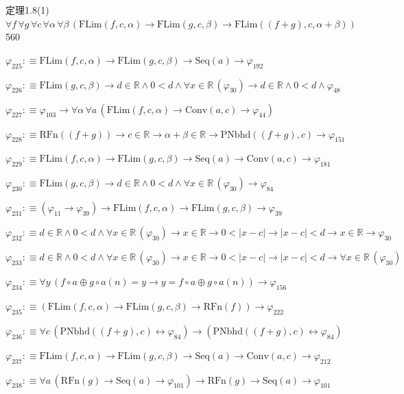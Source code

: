 \begin{fullproof}{定理1.8(1)}{$\forall f\,\forall g\,\forall c\,\forall \alpha\,\forall \beta\,(\mathrm{FLim}(f,c,\alpha) \to \mathrm{FLim}(g,c,\beta) \to \mathrm{FLim}((f + g),c,\alpha + \beta))$}{560}
\begin{abbrevlist}
\item $\varphi_{225} :\equiv \mathrm{FLim}(f,c,\alpha) \to \mathrm{FLim}(g,c,\beta) \to \mathrm{Seq}(a) \to \varphi_{192}$
\item $\varphi_{226} :\equiv \mathrm{FLim}(g,c,\beta) \to d \in \mathbb{R} \land 0 < d \land \forall x \in \mathbb{R}\,(\varphi_{30}) \to d \in \mathbb{R} \land 0 < d \land \varphi_{48}$
\item $\varphi_{227} :\equiv \varphi_{103} \to \forall \alpha\,\forall a\,(\mathrm{FLim}(f,c,\alpha) \to \mathrm{Conv}(a,c) \to \varphi_{44})$
\item $\varphi_{228} :\equiv \mathrm{RFn}((f + g)) \to c \in \mathbb{R} \to \alpha + \beta \in \mathbb{R} \to \mathrm{PNbhd}((f + g),c) \to \varphi_{151}$
\item $\varphi_{229} :\equiv \mathrm{FLim}(f,c,\alpha) \to \mathrm{FLim}(g,c,\beta) \to \mathrm{Seq}(a) \to \mathrm{Conv}(a,c) \to \varphi_{181}$
\item $\varphi_{230} :\equiv \mathrm{FLim}(g,c,\beta) \to d \in \mathbb{R} \land 0 < d \land \forall x \in \mathbb{R}\,(\varphi_{30}) \to \varphi_{84}$
\item $\varphi_{231} :\equiv (\varphi_{11} \to \varphi_{39}) \to \mathrm{FLim}(f,c,\alpha) \to \mathrm{FLim}(g,c,\beta) \to \varphi_{39}$
\item $\varphi_{232} :\equiv d \in \mathbb{R} \land 0 < d \land \forall x \in \mathbb{R}\,(\varphi_{30}) \to x \in \mathbb{R} \to 0 < \lvert x - c \rvert \to \lvert x - c \rvert < d \to x \in \mathbb{R} \to \varphi_{30}$
\item $\varphi_{233} :\equiv d \in \mathbb{R} \land 0 < d \land \forall x \in \mathbb{R}\,(\varphi_{30}) \to x \in \mathbb{R} \to 0 < \lvert x - c \rvert \to \lvert x - c \rvert < d \to \forall x \in \mathbb{R}\,(\varphi_{30})$
\item $\varphi_{234} :\equiv \forall y\,(f \circ a \oplus g \circ a(n) = y \to y = f \circ a \oplus g \circ a(n)) \to \varphi_{156}$
\item $\varphi_{235} :\equiv (\mathrm{FLim}(f,c,\alpha) \to \mathrm{FLim}(g,c,\beta) \to \mathrm{RFn}(f)) \to \varphi_{222}$
\item $\varphi_{236} :\equiv \forall c\,(\mathrm{PNbhd}((f + g),c) \leftrightarrow \varphi_{84}) \to (\mathrm{PNbhd}((f + g),c) \leftrightarrow \varphi_{84})$
\item $\varphi_{237} :\equiv \mathrm{FLim}(f,c,\alpha) \to \mathrm{FLim}(g,c,\beta) \to \mathrm{Seq}(a) \to \mathrm{Conv}(a,c) \to \varphi_{212}$
\item $\varphi_{238} :\equiv \forall a\,(\mathrm{RFn}(g) \to \mathrm{Seq}(a) \to \varphi_{101}) \to \mathrm{RFn}(g) \to \mathrm{Seq}(a) \to \varphi_{101}$

\end{abbrevlist}
\end{fullproof}
